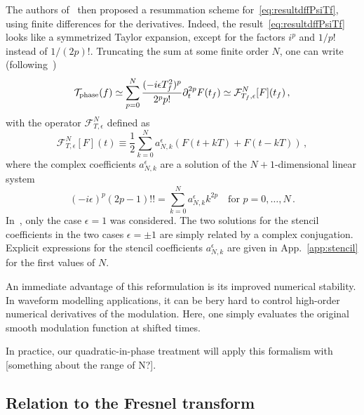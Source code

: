 \documentclass[aps,showpacs,twocolumn,
prd,superscriptaddress,nofootinbib]{revtex4-1}
\newcommand{\be}{\begin{equation}}
\newcommand{\ee}{\end{equation}}
\newcommand\calF{{\mathcal{F}}}
\newcommand\calT{{\mathcal{T}}}
\newcommand{\tf}{t_{f}}
\newcommand{\Tf}{T_{f}}
\newcommand{\jgb}[1]{{\color{DarkGreen} #1}}
\begin{document}
The authors of~\cite{KCY14} then proposed a resummation scheme for~\eqref{eq:resultdffPsiTf}, using finite differences for the derivatives. Indeed, the result~\eqref{eq:resultdffPsiTf} looks like a symmetrized Taylor expansion, except for the factors $i^{p}$ and $1/p!$ instead of $1/(2p)!$. Truncating the sum at some finite order $N$, one can write (following~\cite{KCY14})
\be\label{eq:stencilresult}
	\calT_{\rm phase}(f) \simeq \sum\limits_{p = 0}^{N} \frac{(-i\epsilon\Tf^{2})^{p}}{2^{p}p!} \partial_{t}^{2p}F(\tf) \simeq \calF^{N}_{\Tf, \epsilon}[F] (\tf) \,,
\ee
with the operator $\calF_{T, \epsilon}^{N}$ defined as
\be\label{eq:stencilfresnel}
	\calF_{T, \epsilon}^{N}[F] (t) \equiv \frac{1}{2}\sum\limits_{k=0}^{N} a_{N,k}^{\epsilon} \left( F(t + kT) + F(t - k T) \right) \,,
\ee
where the complex coefficients $a_{N,k}^{\epsilon}$ are a solution of the $N+1$-dimensional linear system~\cite{KCY14}
\be\label{eq:stencilsystem}
	(-i\epsilon)^{p} (2p-1)!! = \sum\limits_{k=0}^{N} a_{N,k}^{\epsilon} k^{2p} \quad \text{for } p=0,\dots,N \,.
\ee
In~\cite{KCY14}, only the case $\epsilon=1$ was considered. The two solutions for the stencil coefficients in the two cases $\epsilon = \pm 1$ are simply related by a complex conjugation. Explicit expressions for the stencil coefficients $a_{N,k}^{\epsilon}$ are given in App.~\ref{app:stencil} for the first values of $N$.

An immediate advantage of this reformulation is its improved numerical stability. In waveform modelling applications, it can be bery hard to control high-order numerical derivatives of the modulation. Here, one simply evaluates the original smooth modulation function at shifted times.

\jgb{In practice, our quadratic-in-phase treatment will apply this formalism with [something about the range of N?]. }


\subsection{Relation to the Fresnel transform}
\label{subsec:fresneltransform}
\end{document}
